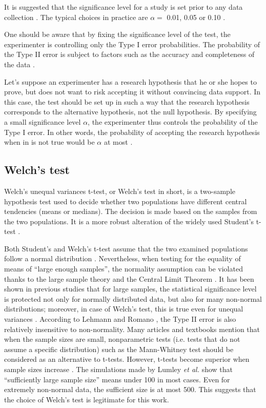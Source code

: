 It is suggested that the significance level for a study is set prior to any data collection \cite{neynman_pearson}. The typical choices in practice are $\alpha =$ 0.01, 0.05 or 0.10 \cite{casella}.

One should be aware that by fixing the significance level of the test, the experimenter is controlling only the Type I error probabilities. The probability of the Type II error is subject to factors such as the accuracy and completeness of the data \cite{sham_purcell}.

Let's suppose an experimenter has a research hypothesis that he or she hopes to prove, but does not want to risk accepting it without convincing data support. In this case, the test should be set up in such a way that the research hypothesis corresponds to the alternative hypothesis, not the null hypothesis. By specifying a small significance level $\alpha$, the experimenter thus controls the probability of the Type I error. In other words, the probability of accepting the research hypothesis when in is not true would be $\alpha$ at most \cite{casella}.



\subsection{Welch's test}

Welch's unequal variances t-test, or Welch's test in short, is a two-sample hypothesis test used to decide whether two populations have different central tendencies (means or medians). The decision is made based on the samples from the two populations. It is a more robust alteration of the widely used Student's t-test \cite{welch}.

Both Student's and Welch's t-test assume that the two examined populations follow a normal distribution \cite{welch}. Nevertheless, when testing for the equality of means of ``large enough samples'', the normality assumption can be violated thanks to the large sample theory and the Central Limit Theorem \cite{lehmann}. It has been shown in previous studies that for large samples, the statistical significance level is protected not only for normally distributed data, but also for many non-normal distributions; moreover, in case of Welch's test, this is true even for unequal variances \cite{zimmerman_zumbo_1993, zumbo_coulombe_1997, lumley}. According to  Lehmann and Romano \cite{lehmann}, the Type II error is also relatively insensitive to non-normality. Many articles and textbooks mention that when the sample sizes are small, nonparametric tests (i.e. tests that do not assume a specific distribution) such as the Mann-Whitney test \cite{mann} should be considered as an alternative to t-tests.
However, t-tests become superior when sample sizes increase \cite{zimmerman1998, lumley}. The simulations made by Lumley \textit{et al.} \cite{lumley} show that ``sufficiently large sample size'' means under 100 in most cases. Even for extremely non-normal data, the sufficient size is at most 500. This suggests that the choice of Welch's test is legitimate for this work.

